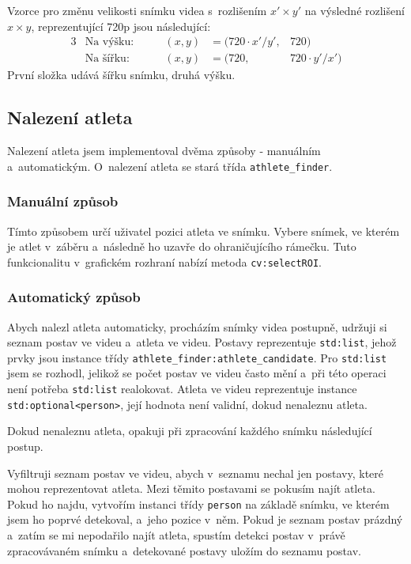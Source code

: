 Vzorce pro změnu velikosti snímku videa s~rozlišením $x'\times y'$ na výsledné rozlišení $x\times y$, reprezentující 720p jsou následující:
\begin{alignat*}{3}
&\text{Na výšku:}   &\qquad (x, y) &= (720 \cdot x' / y',   &720) \\
&\text{Na šířku:}   &\qquad (x, y) &= (720,                 &720 \cdot y' / x')
\end{alignat*}
První složka udává šířku snímku, druhá výšku.



\subsection{Nalezení atleta}

Nalezení atleta jsem implementoval dvěma způsoby - manuálním a~automatickým. O~nalezení atleta se stará třída \texttt{athlete\_finder}.

\subsubsection{Manuální způsob}

Tímto způsobem určí uživatel pozici atleta ve snímku. Vybere snímek, ve kterém je atlet v~záběru a~následně ho uzavře do ohraničujícího rámečku. Tuto funkcionalitu v~grafickém rozhraní nabízí metoda \texttt{cv\::selectROI}.


\subsubsection{Automatický způsob}

Abych nalezl atleta automaticky, procházím snímky videa postupně, udržuji si seznam postav ve videu a~atleta ve videu. Postavy reprezentuje \texttt{std\::list}, jehož prvky jsou instance třídy \texttt{athlete\_finder\::athlete\_candidate}. Pro \texttt{std\::list} jsem se rozhodl, jelikož se počet postav ve videu často mění a~při této operaci není potřeba \texttt{std\::list} realokovat. Atleta ve videu reprezentuje instance \texttt{std\::optional<person>}, její hodnota není validní, dokud nenaleznu atleta.

Dokud nenaleznu atleta, opakuji při zpracování každého snímku následující postup.

Vyfiltruji seznam postav ve videu, abych v~seznamu nechal jen postavy, které mohou reprezentovat atleta. Mezi těmito postavami se pokusím najít atleta. Pokud ho najdu, vytvořím instanci třídy \texttt{person} na základě snímku, ve kterém jsem ho poprvé detekoval, a~jeho pozice v~něm. Pokud je seznam postav prázdný a~zatím se mi nepodařilo najít atleta, spustím detekci postav v~právě zpracovávaném snímku a~detekované postavy uložím do seznamu postav.

